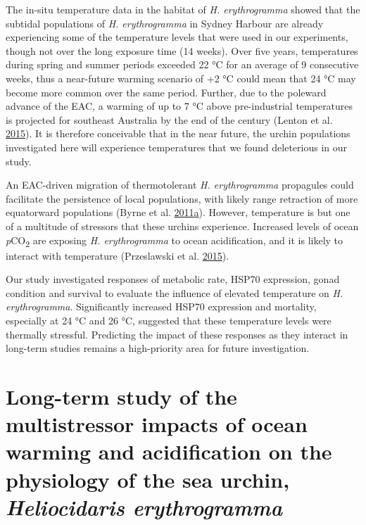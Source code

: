 \documentclass[a4paper,10pt, oneside]{memoir}
\begin{document}
The in-situ temperature data in the habitat of \emph{H. erythrogramma} showed that the subtidal populations of \emph{H. erythrogramma} in Sydney Harbour are already experiencing some of the temperature levels that were used in our experiments, though not over the long exposure time (14 weeks).
Over five years, temperatures during spring and summer periods exceeded 22 °C for an average of 9 consecutive weeks, thus a near-future warming scenario of +2 °C could mean that 24 °C may become more common over the same period.
Further, due to the poleward advance of the EAC, a warming of up to 7 °C above pre-industrial temperatures is projected for southeast Australia by the end of the century (Lenton et al. \protect\hyperlink{ref-Lenton2015}{2015}).
It is therefore conceivable that in the near future, the urchin populations investigated here will experience temperatures that we found deleterious in our study.

An EAC-driven migration of thermotolerant \emph{H. erythrogramma} propagules could facilitate the persistence of local populations, with likely range retraction of more equatorward populations (Byrne et al. \protect\hyperlink{ref-Byrne2011}{2011}\protect\hyperlink{ref-Byrne2011}{a}).
However, temperature is but one of a multitude of stressors that these urchins experience. Increased levels of ocean \emph{p}CO\textsubscript{2} are exposing \emph{H. erythrogramma} to ocean acidification, and it is likely to interact with temperature (Przeslawski et al. \protect\hyperlink{ref-Przeslawski2015}{2015}).

Our study investigated responses of metabolic rate, HSP70 expression, gonad condition and survival to evaluate the influence of elevated temperature on \emph{H. erythrogramma}.
Significantly increased HSP70 expression and mortality, especially at 24 °C and 26 °C, suggested that these temperature levels were thermally stressful.
Predicting the impact of these responses as they interact in long-term studies remains a high-priority area for future investigation.

\hypertarget{multistressor}{%
\chapter{\texorpdfstring{Long-term study of the multistressor impacts of ocean warming and acidification on the physiology of the sea urchin, \emph{Heliocidaris erythrogramma}}{Long-term study of the multistressor impacts of ocean warming and acidification on the physiology of the sea urchin, Heliocidaris erythrogramma}}\label{multistressor}}
\end{document}
